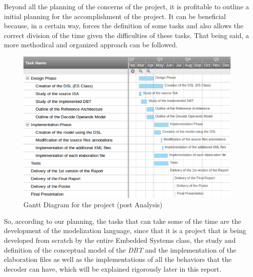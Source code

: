 Beyond all the planning of the concerns of the project, it is profitable to outline a initial planning for the accomplishment of the project. It can be beneficial because, in a certain way, forces the definition of some tasks and also allows the correct division of the time given the difficulties of these tasks. That being said, a more methodical and organized approach can be followed.


\begin{figure}[!hb]
\centerline{
\includegraphics[scale=0.6]{images/planning}}
\caption{Gantt Diagram for the project (post Analysis)}
\label{fig:planning} 
\end{figure}

So, according to our planning, the tasks that can take some of the time are the development of the modelization language, since that it is a project that is being developed from scratch by the entire Embedded Systems class, the study and definition of the conceptual model of the \textit{DBT} and the implementation of the elaboration files as well as the implementations of all the behaviors that the decoder can have, which will be explained rigorously later in this report. 








